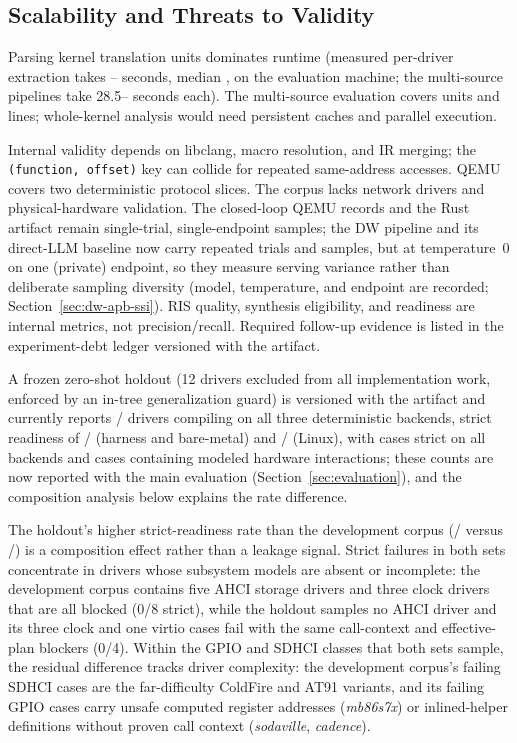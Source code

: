 \subsection{Scalability and Threats to Validity}
\label{sec:limitations}

Parsing kernel translation units dominates runtime (measured per-driver
extraction takes \EvalSecondsMin--\EvalSecondsMax{} seconds, median
\EvalSecondsMedian{}, on the evaluation machine; the multi-source
pipelines take 28.5--\MultiSourceDwcTwoSeconds{} seconds each). The
multi-source evaluation covers \MultiSourceTUs{} units and
\MultiSourceLines{} lines; whole-kernel analysis would need persistent caches
and parallel execution.

Internal validity depends on libclang, macro resolution, and IR merging; the
\texttt{(function, offset)} key can collide for repeated same-address accesses.
QEMU covers two deterministic protocol slices. The corpus lacks network
drivers and physical-hardware validation. The closed-loop QEMU records and
the Rust artifact remain single-trial, single-endpoint samples; the DW
pipeline and its direct-LLM baseline now carry repeated trials and samples,
but at temperature~0 on one (private) endpoint, so they measure serving
variance rather than deliberate sampling diversity (model, temperature, and
endpoint are recorded; Section~\ref{sec:dw-apb-ssi}). RIS quality, synthesis eligibility, and readiness
are internal metrics, not precision/recall. Required follow-up evidence is
listed in the experiment-debt ledger versioned with the artifact.

A frozen zero-shot holdout (12 drivers excluded from all implementation
work, enforced by an in-tree generalization guard) is versioned with the
artifact and currently reports \ZeroShotCompile{}/\ZeroShotCases{} drivers
compiling on all three deterministic backends, strict readiness of
\ZeroShotHarnessStrict{}/\ZeroShotCases{} (harness and bare-metal) and
\ZeroShotLinuxStrict{}/\ZeroShotCases{} (Linux), with \ZeroShotAllStrict{}
cases strict on all backends and \ZeroShotHardwareCases{} cases containing
modeled hardware interactions; these counts are now reported with the
main evaluation (Section~\ref{sec:evaluation}), and the composition
analysis below explains the rate difference.

The holdout's higher strict-readiness rate than the development corpus
(\ZeroShotHarnessStrict{}/\ZeroShotCases{} versus
\HarnessReadyCount{}/\EvalDrivers{}) is a composition effect rather than a
leakage signal. Strict failures in both sets concentrate in drivers whose
subsystem models are absent or incomplete: the development corpus contains
five AHCI storage drivers and three clock drivers that are all blocked
(0/8 strict), while the holdout samples no AHCI driver and its three clock
and one virtio cases fail with the same call-context and effective-plan
blockers (0/4). Within the GPIO and SDHCI classes that both sets sample, the
residual difference tracks driver complexity: the development corpus's
failing SDHCI cases are the far-difficulty ColdFire and AT91 variants, and
its failing GPIO cases carry unsafe computed register addresses
(\emph{mb86s7x}) or inlined-helper definitions without proven call context
(\emph{sodaville}, \emph{cadence}).

